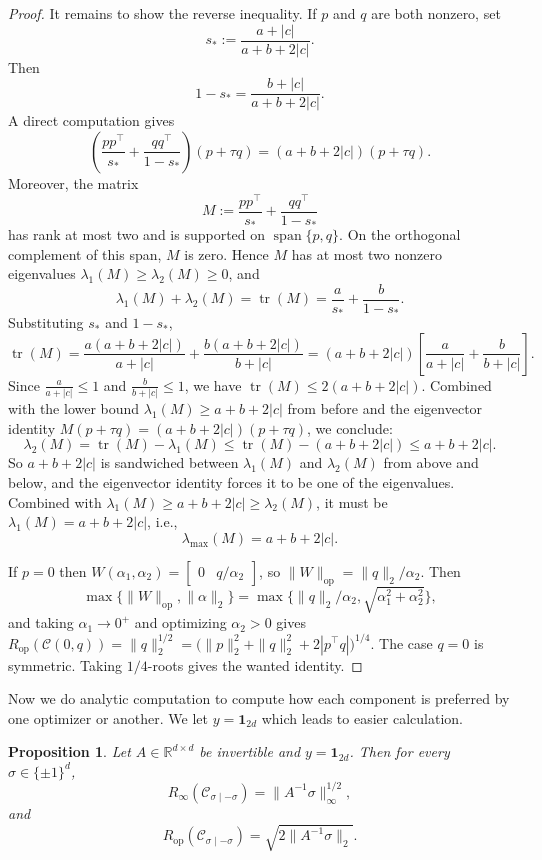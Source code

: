 \documentclass{article}
\newtheorem{proposition}{Proposition}[section]
\newcommand{\op}{\mathrm{op}}
\begin{document}
\begin{proof}
It remains to show the reverse inequality. If $p$ and $q$ are both nonzero, set
\[
s_*:=\frac{a+|c|}{a+b+2|c|}.
\]
Then
\[
1-s_*=\frac{b+|c|}{a+b+2|c|}.
\]
A direct computation gives
\[
\left(
\frac{pp^\top}{s_*}
+
\frac{qq^\top}{1-s_*}
\right)(p+\tau q)
=
(a+b+2|c|)(p+\tau q).
\]
Moreover, the matrix
\[
M:=\frac{pp^\top}{s_*}+\frac{qq^\top}{1-s_*}
\]
has rank at most two and is supported on $\operatorname{span}\{p,q\}$. On the orthogonal complement of this span, $M$ is zero. Hence $M$ has at most two nonzero eigenvalues $\lambda_1(M) \ge \lambda_2(M) \ge 0$, and
\[
\lambda_1(M)+\lambda_2(M)
=
\operatorname{tr}(M)
=
\frac{a}{s_*}+\frac{b}{1-s_*}.
\]
Substituting $s_*$ and $1-s_*$,
\[
\operatorname{tr}(M)
=
\frac{a(a+b+2|c|)}{a+|c|}+\frac{b(a+b+2|c|)}{b+|c|}
=
(a+b+2|c|)\left[\frac{a}{a+|c|}+\frac{b}{b+|c|}\right].
\]
Since $\frac{a}{a+|c|} \le 1$ and $\frac{b}{b+|c|} \le 1$, we have $\operatorname{tr}(M) \le 2(a+b+2|c|)$. Combined with the lower bound $\lambda_1(M) \ge a+b+2|c|$ from before and the eigenvector identity $M(p+\tau q) = (a+b+2|c|)(p+\tau q)$, we conclude:
\[
\lambda_2(M) = \operatorname{tr}(M) - \lambda_1(M) \le \operatorname{tr}(M) - (a+b+2|c|) \le a+b+2|c|.
\]
So $a+b+2|c|$ is sandwiched between $\lambda_1(M)$ and $\lambda_2(M)$ from above and below, and the eigenvector identity forces it to be one of the eigenvalues. Combined with $\lambda_1(M) \ge a+b+2|c| \ge \lambda_2(M)$, it must be $\lambda_1(M) = a+b+2|c|$, i.e.,
\[
\lambda_{\max}(M) = a+b+2|c|.
\]

If $p=0$ then $W(\alpha_1,\alpha_2)=\begin{bmatrix}0 & q/\alpha_2\end{bmatrix}$, so $\|W\|_{\op}=\|q\|_2/\alpha_2$. Then
\[
\max\{\|W\|_{\op},\|\alpha\|_2\}=\max\{\|q\|_2/\alpha_2,\sqrt{\alpha_1^2+\alpha_2^2}\},
\]
and taking $\alpha_1\to 0^+$ and optimizing $\alpha_2>0$ gives $R_{\op}(\mathcal{C}(0,q))=\|q\|_2^{1/2}=\bigl(\|p\|_2^2+\|q\|_2^2+2|p^\top q|\bigr)^{1/4}$. The case $q=0$ is symmetric. Taking $1/4$-roots gives the wanted identity.
\end{proof}

Now we do analytic computation to compute how each component is preferred by one optimizer or another. We let $y = \textbf{1}_{2d}$ which leads to easier calculation. 

\begin{proposition}
\label{prop4:formula_Rop_Rinf}
Let $A\in\mathbb R^{d\times d}$ be invertible and
$y=\mathbf 1_{2d}$. Then for every $\sigma\in\{\pm1\}^d$,
\[
R_\infty(\mathcal C_{\sigma\mid-\sigma})
=
\|A^{-1}\sigma\|_\infty^{1/2},
\]
and
\[
R_{\mathrm{op}}(\mathcal C_{\sigma\mid-\sigma})
=
\sqrt{2\|A^{-1}\sigma\|_2}.
\]
\end{proposition}
\end{document}
